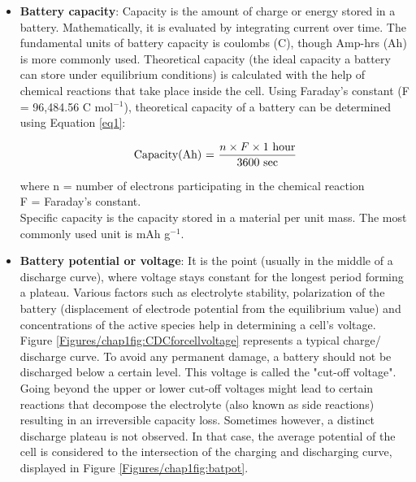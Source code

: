 \begin{itemize}
\item \textbf{Battery capacity}: Capacity is the amount of charge or energy stored in a battery. Mathematically, it is evaluated by integrating current over time. The fundamental units of battery capacity is coulombs (C), though Amp-hrs (Ah) is more commonly used.  Theoretical capacity (the ideal capacity a battery can store under equilibrium conditions) is calculated with the help of chemical reactions that take place inside the cell. Using Faraday's constant (F = 96,484.56 C mol$^{-1}$), theoretical capacity of a battery can be determined using Equation \ref{eq1}:

\begin{equation} \label{eq1}
  \text{Capacity(Ah) = } \frac{n \times F \times 1 \text{ hour}}{3600 \text{ sec}}\\
\end{equation}

where n = number of electrons participating in the chemical reaction \\
F = Faraday's constant. \\ Specific capacity is the capacity stored in a material per unit mass. The most commonly used unit is mAh g$^{-1}$. 
\item \textbf{Battery potential or voltage}: It is the point (usually in the middle of a discharge curve), where voltage stays constant for the longest period forming a plateau. Various factors such as electrolyte stability, polarization of the battery (displacement of electrode potential from the equilibrium value) and concentrations of the active species help in determining a cell's voltage. Figure \ref{Figures/chap1fig:CDCforcellvoltage} represents a typical charge/ discharge curve. To avoid any permanent damage, a battery should not be discharged below a certain level. This voltage is called the "cut-off voltage". Going beyond the upper or lower cut-off voltages might lead to certain reactions that decompose the electrolyte (also known as side reactions) resulting in an irreversible capacity loss. Sometimes however, a distinct discharge plateau is not observed. In that case, the average potential of the cell is considered to the intersection of the charging and discharging curve, displayed in Figure \ref{Figures/chap1fig:batpot}. 


\end{itemize}
